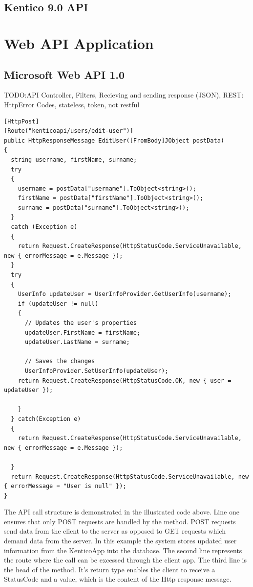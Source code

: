 \subsection{Kentico 9.0 API}

\section{Web API Application}
\subsection{Microsoft Web API 1.0}
TODO:API Controller, Filters, Recieving and sending response (JSON), REST: HttpError Codes, stateless, token, not restful

\lstset{style=sharpc, numbers=left}
\begin{lstlisting}
[HttpPost]
[Route("kenticoapi/users/edit-user")]
public HttpResponseMessage EditUser([FromBody]JObject postData)
{
  string username, firstName, surname;
  try
  {
    username = postData["username"].ToObject<string>();
    firstName = postData["firstName"].ToObject<string>(); 
    surname = postData["surname"].ToObject<string>();
  }
  catch (Exception e)
  {
    return Request.CreateResponse(HttpStatusCode.ServiceUnavailable, new { errorMessage = e.Message });
  }
  try
  {
    UserInfo updateUser = UserInfoProvider.GetUserInfo(username);
    if (updateUser != null)
    {
      // Updates the user's properties
      updateUser.FirstName = firstName;
      updateUser.LastName = surname;

      // Saves the changes
      UserInfoProvider.SetUserInfo(updateUser);
    return Request.CreateResponse(HttpStatusCode.OK, new { user = updateUser });

    }
  } catch(Exception e)
  {
    return Request.CreateResponse(HttpStatusCode.ServiceUnavailable, new { errorMessage = e.Message });

  }
  return Request.CreateResponse(HttpStatusCode.ServiceUnavailable, new { errorMessage = "User is null" });
}
\end{lstlisting}
The API call structure is demonstrated in the illustrated code above. Line one ensures that only POST requests are handled by the method. POST requests send data from the client to the server as opposed to GET requests which demand data from the server. In this example the system stores updated user information from the KenticoApp into the database. The second line represents the route where the call can be excessed through the client app. The third line is the head of the method. It's return type enables the client to receive a StatusCode and a value, which is the content of the Http response message.

